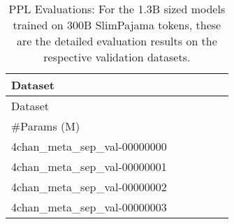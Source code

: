 {\footnotesize
	\newlength{\mywidth}
	\setlength{\mywidth}{1.7cm}
	\addtolength{\mywidth}{-\tabcolsep}
	\setlength{\tabcolsep}{0pt}
\begin{longtable}{m{6cm}m{1.7cm}m{1.7cm}m{1.7cm}m{1.7cm}m{1.7cm}}
 \caption{PPL Evaluations: For the 1.3B sized models trained on 300B SlimPajama tokens, these are the detailed evaluation results on the respective validation datasets.
\label{tab:spaj300B_ppl_evaluation_detail}}\\

	Dataset & \makebox[\mywidth][c]{Llama} & \makebox[\mywidth][c]{Mamba} & \makebox[\mywidth][c]{RWKV-4} & \makebox[\mywidth][c]{xLSTM[7:1]} & \makebox[\mywidth][c]{xLSTM[1:0]} \\ \endfirsthead
	Dataset & \makebox[\mywidth][c]{Llama} & \makebox[\mywidth][c]{Mamba} & \makebox[\mywidth][c]{RWKV-4} & \makebox[\mywidth][c]{xLSTM[7:1]} & \makebox[\mywidth][c]{xLSTM[1:0]} \\ \endhead
	\hline
	\#Params (M) & \makebox[\mywidth][c]{1420} & \makebox[\mywidth][c]{1475} & \makebox[\mywidth][c]{1515} & \makebox[\mywidth][c]{1420} & \makebox[\mywidth][c]{1423} \\
	4chan\_meta\_sep\_val-00000000  & \colorbox[HTML]{91d183}{\makebox[\mywidth][c]{9.58}} & \colorbox[HTML]{c9e99b}{\makebox[\mywidth][c]{9.72}} & \colorbox[HTML]{ffffe5}{\makebox[\mywidth][c]{11.37}} & \colorbox[HTML]{77c578}{\makebox[\mywidth][c]{9.53}} & \colorbox[HTML]{84cb7d}{\makebox[\mywidth][c]{9.55}}\\
	4chan\_meta\_sep\_val-00000001  & \colorbox[HTML]{a0d789}{\makebox[\mywidth][c]{9.95}} & \colorbox[HTML]{ceeb9e}{\makebox[\mywidth][c]{10.06}} & \colorbox[HTML]{ffffe5}{\makebox[\mywidth][c]{11.57}} & \colorbox[HTML]{8bce80}{\makebox[\mywidth][c]{9.91}} & \colorbox[HTML]{77c578}{\makebox[\mywidth][c]{9.88}}\\
	4chan\_meta\_sep\_val-00000002  & \colorbox[HTML]{8ccf81}{\makebox[\mywidth][c]{9.42}} & \colorbox[HTML]{c3e698}{\makebox[\mywidth][c]{9.53}} & \colorbox[HTML]{ffffe5}{\makebox[\mywidth][c]{11.00}} & \colorbox[HTML]{7fc97b}{\makebox[\mywidth][c]{9.40}} & \colorbox[HTML]{77c578}{\makebox[\mywidth][c]{9.38}}\\
	4chan\_meta\_sep\_val-00000003  & \colorbox[HTML]{81c97c}{\makebox[\mywidth][c]{9.78}} & \colorbox[HTML]{c6e89a}{\makebox[\mywidth][c]{9.93}} & \colorbox[HTML]{ffffe5}{\makebox[\mywidth][c]{11.48}} & \colorbox[HTML]{7cc77a}{\makebox[\mywidth][c]{9.77}} & \colorbox[HTML]{77c578}{\makebox[\mywidth][c]{9.77}}\\

\end{longtable}}
